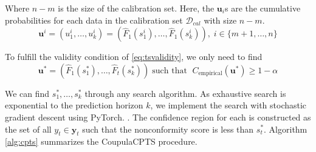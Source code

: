 Where $n-m$ is the size of the calibration set. Here, the $\mathbf{u}_i$s are the cumulative probabilities for each data in the calibration set $\mathcal{D}_{cal}$ with size $n-m$. 
\[
     \mathbf{u}^i = (u^i_1, \ldots, u^i_k) = (\hat{F}_1(s^i_1), \ldots, \hat{F}_1(s^i_k)), \; i\in \{m+1, \ldots, n\} 
\]


 To fulfill the validity condition of \autoref{eq:tsvalidity}, we only need to find  
\begin{equation}
     \mathbf{u^*}=(\hat{F}_1(s^*_1), \ldots, \hat{F}_t(s^*_k)) \; \text{such that } \; C_{\text{empirical}} (\mathbf{u^*}) \geq 1-\alpha
\label{eq:search}
\end{equation}

We can find  $s_1^*, \ldots, s_k^*$ through any search algorithm. As exhaustive search is exponential to the prediction horizon $k$, we implement the search with stochastic gradient descent using PyTorch. . The confidence region for each  is constructed as the set of all $y_t \in \textbf{y}_t$ such that the nonconformity score is less than $s_t^*$. Algorithm \ref{alg:cpts} summarizes the CoupulaCPTS procedure. 

